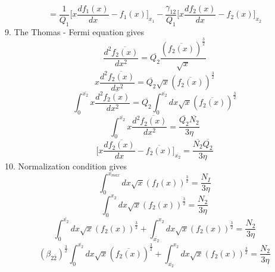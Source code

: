 \documentclass[fleqn, 10pt]{article}
\begin{document}
           \begin{equation}
               = \frac{1}{Q_1} \biggl[ x \frac{df_1(x)}{dx} - f_1(x) \biggr]_{x_1} - \frac{\gamma_{12}}{Q_1} \biggl[ x \frac{df_2(x)}{dx} - f_2(x) \biggr]_{x_2}
               \label{114}
           \end{equation}
9.          The Thomas - Fermi equation gives 
    \begin{equation*}
        \frac{d^2\overline{f_2(x)}}{dx^2} = \overline{Q_2} \frac{(\overline{f_2(x)})^\frac{3}{2}}{\sqrt{x}}
    \end{equation*}
    \begin{equation*}
        x\frac{d^2\overline{f_2(x)}}{dx^2} = \overline{Q_2}\sqrt{x}(\overline{f_2(x)})^\frac{3}{2}
    \end{equation*}
    \begin{equation*}
        \int^{\overline{x_2}}_0 x \frac{d^2\overline{f_2(x)}}{dx^2} = \overline{Q_2} \int^{\overline{x_2}}_0 dx \sqrt{x} (\overline{f_2(x)})^\frac{3}{2}
    \end{equation*}
    \begin{equation*}
        \int^{\overline{x_2}}_0 x\frac{d^2\overline{f_2(x)}}{dx^2} = \frac{\overline{Q_2}\overline{N_2}}{3\eta} \end{equation*}
        \begin{equation}
            \biggl[ x \frac{d\overline{f_2(x)}}{dx}- \overline{f_2(x)} \biggr]_{\overline{x_2}} = \frac{\overline{N_2}\overline{Q_2}}{3\eta}
            \label{34}
        \end{equation}
10.        Normalization condition gives
        \begin{equation*}
            \int^{x_{max}}_0 dx \sqrt{x} (f_I(x))^\frac{3}{2} = \frac{N_I}{3\eta}
        \end{equation*}
        \begin{equation*}
            \int^{x_2}_0 dx \sqrt{x} (f_2(x))^\frac{3}{2} = \frac{N_2}{3\eta}
        \end{equation*}
        \begin{equation*}
            \int^{\overline{x_2}}_0 dx \sqrt{x}(f_2(x))^\frac{3}{2} + \int^{x_2}_{\overline{x_2}}dx \sqrt{x} (f_2(x))^\frac{3}{2} = \frac{N_2}{3\eta}
        \end{equation*}
        \begin{equation*}
            (\beta_{2\overline{2}})^\frac{3}{2} \int^{\overline{x_2}}_0 dx \sqrt{x}(\overline{f_2(x)})^\frac{3}{2} + \int^{x_2}_{\overline{x_2}} dx \sqrt{x} (f_2(x))^\frac{3}{2} = \frac{N_2}{3\eta}
        \end{equation*}
\end{document}

